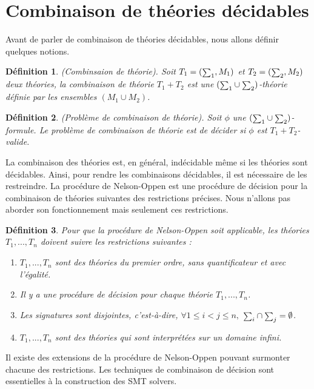 \documentclass[9pt,openany]{book}
\newcommand\smallsum{\mathsmaller\sum}
\newtheorem{definition}{D\'efinition}[section]
\begin{document}
	
 	\section{Combinaison de th\'eories d\'ecidables}
 	Avant de parler de combinaison de th\'eories d\'ecidables, nous allons d\'efinir quelques notions.
 	\begin{definition}
 	(Combinsaion de th\'eorie).
 		Soit $T_{1}=(\smallsum_{1},M_{1})$ et $T_{2}=(\smallsum_{2},M_{2})$ deux th\'eories, la combinaison de th\'eorie $T_{1} + T_{2}$ est une $(\smallsum_{1}\cup\smallsum_{2})$-th\'eorie d\'efinie par les ensembles $(M_{1}\cup M_{2})$.
	\end{definition}
	
	\begin{definition}
	(Probl\`eme de combinaison de th\'eorie). Soit $\phi$ une $(\smallsum_{1}\cup\smallsum_{2})$-formule. Le probl\`eme de combinaison de th\'eorie est de d\'ecider si $\phi$ est $T_{1}+T_{2}$-valide.
	\end{definition}\par
	La combinaison des th\'eories est, en g\'en\'eral, ind\'ecidable m\^eme si les th\'eories sont d\'ecidables. Ainsi, pour rendre les combinaisons d\'ecidables, il est n\'ecessaire de les restreindre.	La proc\'edure de Nelson-Oppen est une proc\'edure de d\'ecision pour la combinaison de th\'eories suivantes des restrictions pr\'ecises. Nous n'allons pas aborder son fonctionnement mais seulement ces restrictions.
	\begin{definition}
		Pour que la proc\'edure de Nelson-Oppen soit applicable, les th\'eories $T_{1},...,T_{n}$ doivent suivre les restrictions suivantes :
		\begin{enumerate}
		\item $T_{1},...,T_{n}$ sont des th\'eories du premier ordre, sans quantificateur et avec l'\'egalit\'e.
		\item Il y a une proc\'edure de d\'ecision pour chaque th\'eorie $T_{1},...,T_{n}$.
		\item Les signatures sont disjointes, c'est-\`a-dire, $\forall 1\leq i<j\leq n,$ $\smallsum_{i}\cap\smallsum_{j}=\emptyset$.
		\item $T_{1},...,T_{n}$ sont des th\'eories qui sont interpr\'et\'ees sur un domaine infini.
		\end{enumerate}
	\end{definition}
	Il existe des extensions de la proc\'edure de Nelson-Oppen pouvant surmonter chacune des restrictions. Les techniques de combinaison de d\'ecision sont essentielles \`a la construction des SMT solvers.
\end{document}
